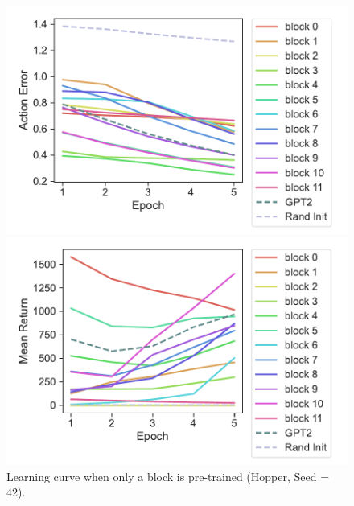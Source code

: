 \documentclass{article}
\begin{document}
\begin{figure}[H]
    \centering
    \begin{minipage}[b]{0.48\linewidth}
        \includegraphics[width=\linewidth]{figs/actionerror_block_gpt2_dt_K1_hopper_medium_42.pdf}
    \end{minipage}
    \begin{minipage}[b]{0.48\linewidth}
        \includegraphics[width=\linewidth]{figs/returnmean_block_gpt2_dt_K1_hopper_medium_42.pdf}
    \end{minipage}
    \caption{Learning curve when only a block is pre-trained (Hopper, Seed = 42).}
    \label{fig:learning_curve_hopper_42}
\end{figure}
\end{document}
